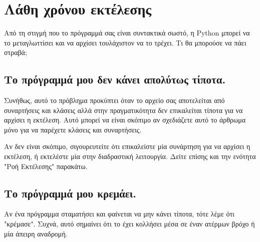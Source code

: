 \documentclass[10pt]{book}
\begin{document}
\section{Λάθη χρόνου εκτέλεσης}

Από τη στιγμή που το πρόγραμμά σας είναι συντακτικά σωστό, η Python μπορεί να το 
μεταγλωττίσει και να αρχίσει τουλάχιστον να το τρέχει. Τι θα μπορούσε να πάει στραβά;  


\subsection{Το πρόγραμμά μου δεν κάνει απολύτως τίποτα.}

Συνήθως, αυτό το πρόβλημα προκύπτει όταν το αρχείο σας αποτελείται από συναρτήσεις και 
κλάσεις αλλά στην πραγματικότητα δεν επικαλείται τίποτα για να αρχίσει η εκτέλεση.  
Αυτό μπορεί να είναι σκόπιμο αν σχεδιάζετε αυτό το άρθρωμα μόνο για να παρέχετε 
κλάσεις και συναρτήσεις.

Αν δεν είναι σκόπιμο, σιγουρευτείτε ότι επικαλείστε μία συνάρτηση για να αρχίσει η εκτέλεση, 
ή εκτελέστε μία στην διαδραστική λειτουργία.  Δείτε επίσης και την ενότητα "Ροή Εκτέλεσης" παρακάτω.


\subsection{Το πρόγραμμά μου κρεμάει.}

Αν ένα πρόγραμμα σταματήσει και φαίνεται να μην κάνει τίποτα, τότε λέμε ότι "κρέμασε". Συχνά, αυτό
σημαίνει ότι το έχει κολλήσει μέσα σε έναν ατέρμων βρόχο ή μία άπειρη αναδρομή. 
\end{document}
